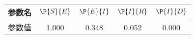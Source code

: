\begin{tabular}{ccccc}
\hline
参数名&$\P{S}{E}$&$\P{E}{I}$&$\P{I}{R}$&$\P{I}{D}$\\
\hline
参数值&1.000&0.348&0.052&0.000\\
\hline
\end{tabular}